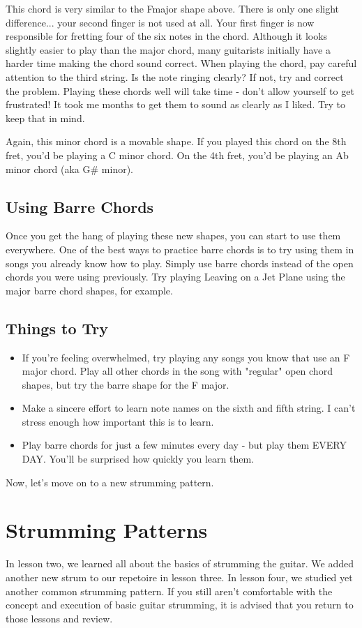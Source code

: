 This chord is very similar to the Fmajor shape above. There is only one slight difference... your second finger is not used at all. Your first finger is now responsible for fretting four of the six notes in the chord. Although it looks slightly easier to play than the major chord, many guitarists initially have a harder time making the chord sound correct. When playing the chord, pay careful attention to the third string. Is the note ringing clearly? If not, try and correct the problem. Playing these chords well will take time - don't allow yourself to get frustrated! It took me months to get them to sound as clearly as I liked. Try to keep that in mind.

Again, this minor chord is a movable shape. If you played this chord on the 8th fret, you'd be playing a C minor chord. On the 4th fret, you'd be playing an Ab minor chord (aka G\# minor). 

\subsection{Using Barre Chords}
Once you get the hang of playing these new shapes, you can start to use them everywhere. One of the best ways to practice barre chords is to try using them in songs you already know how to play. Simply use barre chords instead of the open chords you were using previously. Try playing Leaving on a Jet Plane using the major barre chord shapes, for example. 

\subsection{Things to Try}
\begin{itemize}
\item If you're feeling overwhelmed, try playing any songs you know that use an F major chord. Play all other chords in the song with "regular" open chord shapes, but try the barre shape for the F major.
\item Make a sincere effort to learn note names on the sixth and fifth string. I can't stress enough how important this is to learn.
\item Play barre chords for just a few minutes every day - but play them EVERY DAY. You'll be surprised how quickly you learn them. 
\end{itemize}
Now, let's move on to a new strumming pattern. 

\section{Strumming Patterns}
In lesson two, we learned all about the basics of strumming the guitar. We added another new strum to our repetoire in lesson three. In lesson four, we studied yet another common strumming pattern. If you still aren't comfortable with the concept and execution of basic guitar strumming, it is advised that you return to those lessons and review. 

